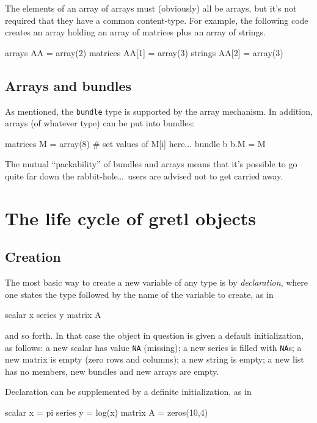 The elements of an array of arrays must (obviously) all be arrays, but
it's not required that they have a common content-type. For example,
the following code creates an array holding an array of matrices plus
an array of strings.
\begin{code}
arrays AA = array(2)
matrices AA[1] = array(3)
strings AA[2] = array(3)
\end{code}

\subsection{Arrays and bundles}

As mentioned, the \texttt{bundle} type is supported by the array
mechanism. In addition, arrays (of whatever type) can be put into
bundles:
\begin{code}
matrices M = array(8)
# set values of M[i] here...
bundle b
b.M = M
\end{code}

The mutual ``packability'' of bundles and arrays means that it's
possible to go quite far down the rabbit-hole\dots\ users are advised
not to get carried away.

\section{The life cycle of gretl objects}

\subsection{Creation}

The most basic way to create a new variable of any type is by
\textit{declaration}, where one states the type followed by the name
of the variable to create, as in

\begin{code}
scalar x
series y
matrix A
\end{code}

and so forth. In that case the object in question is given a default
initialization, as follows: a new scalar has value \texttt{NA}
(missing); a new series is filled with \texttt{NA}s; a new matrix is
empty (zero rows and columns); a new string is empty; a new list has no
members, new bundles and new arrays are empty.

Declaration can be supplemented by a definite initialization, as in

\begin{code}
scalar x = pi
series y = log(x)
matrix A = zeros(10,4)
\end{code}

